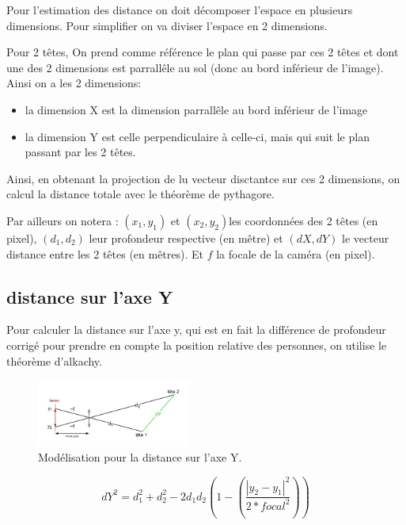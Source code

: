 

Pour l'estimation des distance on doit décomposer l'espace en plusieurs dimensions. Pour simplifier on va diviser l'espace en 2 dimensions.

Pour 2 têtes, On prend comme référence le plan qui passe par ces 2 têtes et dont une des 2 dimensions est parrallêle au sol (donc au bord inférieur de l'image). Ainsi on a les 2 dimensions:

\begin{itemize}
    \item la dimension X est la dimension parrallêle au bord inférieur de l'image
    \item la dimension Y est celle perpendiculaire à celle-ci, mais qui suit le plan passant par les 2 têtes.
\end{itemize}


Ainsi, en obtenant la projection de lu vecteur disctantce sur ces 2 dimensions, on calcul la distance totale avec le théorème de pythagore.

Par ailleurs on notera : $(x_1, y_1)$ et $(x_2, y_2) $les coordonnées des 2 têtes (en pixel), $(d_1,d_2)$ leur profondeur respective (en mêtre) et $(dX, dY)$ le vecteur distance entre les 2 têtes (en mêtres). Et $f$ la focale de la caméra (en pixel).

\subsection{distance sur l'axe Y}

Pour calculer la distance sur l'axe y, qui est en fait la différence de profondeur corrigé pour prendre en compte la position relative des personnes, on utilise le théorème d'alkachy.

\begin{figure}[h!]
    \centering
    \includegraphics[width=0.45\textwidth]{images/dY_estimation.drawio.png}
    \caption{Modélisation pour la distance sur l'axe Y.}
    \label{fig:alkachy}
\end{figure}

\begin{equation}
    dY^2 = d_1^2 + d_2^2 - 2d_1d_2 ( 1 - ( \frac{|y_2-y_1|^2}{2*focal^2} ) )
\end{equation}

